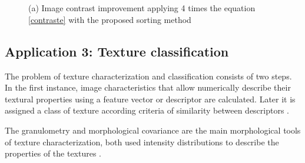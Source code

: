 
\begin{figure}
	\\
	\\
	\caption{(a) Image contrast improvement applying 4 times the equation \ref{contraste} with the proposed sorting method}
  \label{fig:mejora}
\end{figure}


\subsection{Application 3: Texture classification}

 The problem of texture characterization and classification consists of two steps. In the first instance, image characteristics that allow numerically describe their textural properties using a feature vector or descriptor are calculated. Later it is assigned a class of texture according criteria of similarity between descriptors \cite{hanbury2005illumination}.

The granulometry and morphological covariance are the main morphological tools of texture characterization, both used intensity distributions to describe the properties of the textures \cite{lefevre2009beyond}.


